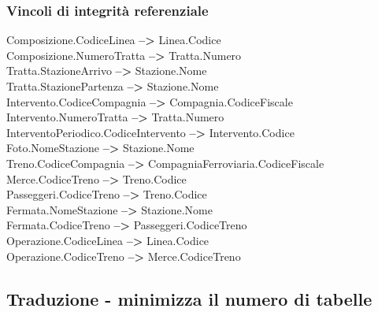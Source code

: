 \documentclass{article}
\begin{document}
\subsubsection*{Vincoli di integrità referenziale}
Composizione.CodiceLinea \textbf{-->} Linea.Codice \vspace*{3pt}\\
Composizione.NumeroTratta \textbf{-->} Tratta.Numero \vspace*{3pt}\\
Tratta.StazioneArrivo \textbf{-->} Stazione.Nome \vspace*{3pt}\\
Tratta.StazionePartenza \textbf{-->} Stazione.Nome \vspace*{3pt}\\
Intervento.CodiceCompagnia \textbf{-->} Compagnia.CodiceFiscale \vspace*{3pt}\\
Intervento.NumeroTratta \textbf{-->} Tratta.Numero \vspace*{3pt}\\
InterventoPeriodico.CodiceIntervento \textbf{-->} Intervento.Codice \vspace*{3pt}\\
Foto.NomeStazione \textbf{-->} Stazione.Nome \vspace*{3pt}\\
Treno.CodiceCompagnia \textbf{-->} CompagniaFerroviaria.CodiceFiscale \vspace*{3pt}\\
Merce.CodiceTreno \textbf{-->} Treno.Codice \vspace*{3pt}\\
Passeggeri.CodiceTreno \textbf{-->} Treno.Codice \vspace*{3pt}\\
Fermata.NomeStazione \textbf{-->} Stazione.Nome \vspace*{3pt}\\
Fermata.CodiceTreno \textbf{-->} Passeggeri.CodiceTreno \vspace*{3pt}\\
Operazione.CodiceLinea \textbf{-->} Linea.Codice \vspace*{3pt}\\
Operazione.CodiceTreno \textbf{-->} Merce.CodiceTreno \vspace*{3pt}\\

\subsection*{Traduzione - minimizza il numero di tabelle}
\end{document}

